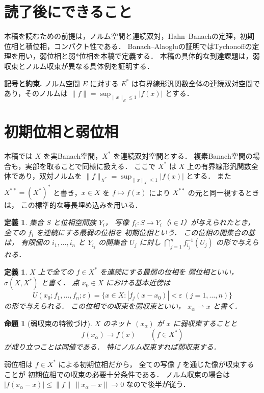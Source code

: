 \documentclass[a5paper,10pt,onecolumn]{jsarticle}
\makeatletter
\theoremstyle{mathnotetheorem}
\newtheorem{definition}[theorem]{定義}
\newtheorem{proposition}[theorem]{命題}
\renewcommand{\proofname}{証明}
\renewenvironment{proof}[1][\proofname]{%
  \par\pushQED{\qed}\normalfont\topsep4\p@\@plus2\p@\relax
  \trivlist\item[\hskip\labelsep\bfseries #1]\ignorespaces
}{\popQED\endtrivlist\@endpefalse}
\newcommand{\norm}[1]{\lVert #1\rVert}
\makeatother
\begin{document}
\section*{読了後にできること}
本稿を読むための前提は，ノルム空間と連続双対，Hahn--Banachの定理，初期位相と積位相，コンパクト性である．
Banach--Alaogluの証明ではTychonoffの定理を用い，弱位相と弱*位相を本稿で定義する．
本稿の具体的な到達課題は，弱収束とノルム収束が異なる具体例を証明する．


\par\noindent\textbf{記号と約束.}\quad
ノルム空間 $E$ に対する $E^*$ は有界線形汎関数全体の連続双対空間であり，そのノルムは $\|f\|=\sup_{\|x\|_E\le1}|f(x)|$ とする．
\par

\section{初期位相と弱位相}

本稿では $X$ を実Banach空間，$X^*$ を連続双対空間とする．
複素Banach空間の場合も，実部を取ることで同様に扱える．
ここで $X^*$ は $X$ 上の有界線形汎関数全体であり，双対ノルムを
$\|f\|_{X^*}=\sup_{\|x\|_X\le 1}|f(x)|$ とする．
また $X^{**}=(X^*)^*$ と書き，$x\in X$ を
$f\mapsto f(x)$ により $X^{**}$ の元と同一視するときは，
この標準的な等長埋め込みを用いる．

\begin{definition}
集合 $S$ と位相空間族 $Y_i$，
写像 $f_i:S\to Y_i$（$i\in I$）が与えられたとき，
全ての $f_i$ を連続にする最弱の位相を
\emph{初期位相}という．
この位相の開集合の基は，
有限個の $i_1,\dots,i_n$ と
$Y_{i_j}$ の開集合 $U_j$ に対し
$\bigcap_{j=1}^nf_{i_j}^{-1}(U_j)$ の形で与えられる．
\end{definition}

\begin{definition}
$X$ 上で全ての $f\in X^*$ を連続にする最弱の位相を
\emph{弱位相}といい，$\sigma(X,X^*)$ と書く．
点 $x_0\in X$ における基本近傍は
\[
 U(x_0;f_1,\dots,f_n;\varepsilon)
 =\{x\in X:|f_j(x-x_0)|<\varepsilon\
  (j=1,\dots,n)\}
\]
の形で与えられる．
この位相での収束を弱収束といい，
$x_\alpha\rightharpoonup x$ と書く．
\end{definition}

\begin{proposition}[弱収束の特徴づけ]\label{prop:weak-conv}
$X$ のネット $(x_\alpha)$ が $x$ に弱収束することと
\[
 f(x_\alpha)\to f(x)\qquad(f\in X^*)
\]
が成り立つことは同値である．
特にノルム収束すれば弱収束する．
\end{proposition}
\begin{proof}
弱位相は $f\in X^*$ による初期位相だから，
全ての写像 $f$ を通じた像が収束することが
初期位相での収束の必要十分条件である．
ノルム収束の場合は
$|f(x_\alpha-x)|\le\norm f\,\norm{x_\alpha-x}\to0$
なので後半が従う．
\end{proof}
\end{document}
